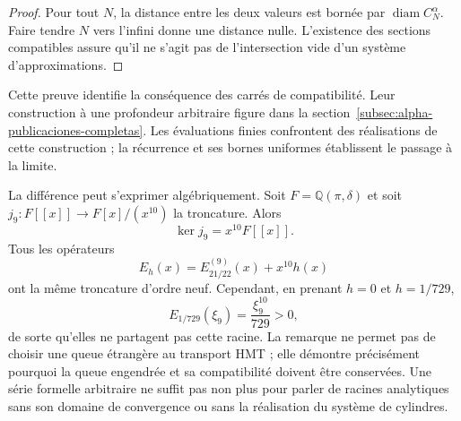 \begin{proof}
Pour tout \(N\), la distance entre les deux valeurs est bornée
par \(\operatorname{diam}C_N^\alpha\). Faire tendre \(N\) vers l'infini
donne une distance nulle. L'existence des sections compatibles assure
qu'il ne s'agit pas de l'intersection vide d'un système d'approximations.
\end{proof}

Cette preuve identifie la conséquence des carrés de compatibilité.
Leur construction à une profondeur arbitraire figure dans la
section~\ref{subsec:alpha-publicaciones-completas}. Les évaluations
finies confrontent des réalisations de cette construction ; la récurrence
et ses bornes uniformes établissent le passage à la limite.

La différence peut s'exprimer algébriquement. Soit \(F=\mathbb Q(\pi,\delta)\) et soit \(j_9:F[[x]]\to F[x]/(x^{10})\) la troncature. Alors
\[
 \ker j_9=x^{10}F[[x]].
\]
Tous les opérateurs
\[
 E_h(x)=E_{21/22}^{(9)}(x)+x^{10}h(x)
\]
ont la même troncature d'ordre neuf. Cependant, en prenant
\(h=0\) et \(h=1/729\),
\[
 E_{1/729}(\xi_9)=\frac{\xi_9^{10}}{729}>0,
\]
de sorte qu’elles ne partagent pas cette racine. La remarque ne permet pas de choisir une
queue étrangère au transport HMT ; elle démontre précisément pourquoi la queue
engendrée et sa compatibilité doivent être conservées. Une série
formelle arbitraire ne suffit pas non plus pour parler de racines analytiques sans son domaine de
convergence ou sans la réalisation du système de cylindres.

